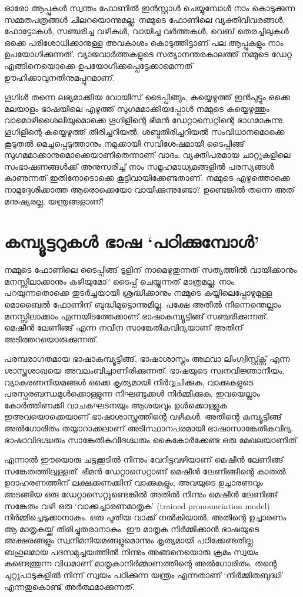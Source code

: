 \documentclass[12pt,twoside,a4paper]{article}
\begin{document}
ഓരോ ആപ്പുകൾ സ്വന്തം ഫോണിൽ ഇൻസ്റ്റാൾ ചെയ്യുമ്പോൾ നാം കൊടുക്കുന്ന സമ്മതപത്രങ്ങൾ ചിലറയൊന്നുമല്ല. നമ്മുടെ ഫോണിലെ വ്യക്തിവിവരങ്ങൾ, ഫോട്ടോകൾ, സഞ്ചരിച്ച വഴികൾ, വായിച്ച വർത്തകൾ, വെബ് തെരച്ചിലുകൾ ഒക്കെ പരിശോധിക്കാനുള്ള അവകാശം കൊടുത്തിട്ടാണ് പല ആപ്പുകളും നാം ഉപയോഗിക്കുന്നത്.  വ്യാജവാർത്തകളുടെ സത്യാനന്തരകാലത്ത്  നമ്മുടെ ഡേറ്റ എങ്ങിനെയൊക്കെ ഉപയോഗിക്കപ്പെട്ടേക്കാമെന്നത് ഊഹിക്കാവുനതിനുമപ്പുറമാണ്. 

ഗൂഗിൾ തന്നെ ലഭ്യമാക്കിയ വോയിസ് ടൈപ്പിങ്ങും, കയ്യെഴുത്ത് ഇൻപുട്ടും ഒക്കെ മലയാളം ഭാഷയിലെ എഴുത്ത് സുഗമമാക്കിയപ്പോൾ നമ്മുടെ കയ്യെഴുത്തും വാമൊഴിശൈലിയുമൊക്കെ ഗൂഗിളിന്റെ ഭീമൻ ഡേറ്റാസെറ്റിന്റെ ഭാഗമാകുന്നു. ഗൂഗിളിന്റെ കയ്യെഴുത്ത് തിരിച്ചറിയൽ, ശബ്ദതിരിച്ചറിയൽ സംവിധാനമൊക്കെ കൂടുതൽ മെച്ചപ്പെടുത്താനും നമുക്കായി സവിശേഷമായി ടൈപ്പിങ്ങ് സുഗമമാക്കാനുമൊക്കെയാണിതെന്നാണ് വാദം. വ്യക്തിപരമായ ചാറ്റുകളിലെ സംഭാഷണങ്ങൾക്ക് അനുസരിച്ച് നാം സമൂഹമാധ്യമങ്ങളിൽ പരസ്യങ്ങൾ  കാണുന്നത് ഇതിനോടൊക്കെ കൂട്ടിവായിക്കേണ്ടതാണ്. നമ്മുടെ എഴുത്തൊക്കെ നാമുദ്ദേശിക്കാത്ത ആരൊക്കെയോ വായിക്കുന്നുണ്ടോ? ഉണ്ടെങ്കിൽ തന്നെ അത് മനുഷ്യരല്ല, യന്ത്രങ്ങളാണ്!

\section{കമ്പ്യൂട്ടറുകൾ ഭാഷ `പഠിക്കുമ്പോൾ'}

നമ്മുടെ ഫോണിലെ ടൈപ്പിങ്ങ് ടൂളിന് നാമെഴുതുന്നത്  സത്യത്തിൽ വായിക്കാനും മനസ്സിലാക്കാനും കഴിയുമോ?  ടൈപ്പ് ചെയ്യുന്നത് മാത്രമല്ല, നാം പറയുന്നതൊക്കെ തുടർച്ചയായി ശ്രദ്ധിക്കാനും നമ്മുടെ കയ്യിലെപ്പോഴുമുള്ള മൊബൈൽ ഫോണിന് ബുദ്ധിമുട്ടൊന്നുമില്ല. പക്ഷേ അതിൽ നിന്നെന്തെല്ലാം മനസ്സിലാക്കാം എന്നയിടത്തേക്കാണ് ഭാഷാകമ്പ്യൂട്ടിങ്ങ് സഞ്ചരിക്കുന്നത്. മെഷീൻ ലേണിങ്ങ് എന്ന നവീന സാങ്കേതികവിദ്യയാണ് അതിന് അടിത്തറയൊരുക്കുന്നത്.

പരമ്പരാഗതമായ ഭാഷാകമ്പ്യൂട്ടിങ്ങ്, ഭാഷാശാസ്ത്രം അഥവാ ലിംഗ്വിസ്റ്റ്ക്സ് എന്ന ശാസ്ത്രശാഖയെ അവലംബിച്ചാണിരിക്കുന്നത്. ഭാഷയുടെ സ്വനവിജ്ഞാനീയം, വ്യാകരണനിയമങ്ങൾ ഒക്കെ കൃത്യമായി നിർവ്വചിക്കുക, വാക്കുകളുടെ പരസ്പരബന്ധമുൾക്കൊള്ളുന്ന നിഘണ്ടുക്കൾ നിർമ്മിക്കുക, ഇവയെല്ലാം കോർത്തിണക്കി വാചകഘടനയും ആശയവും ഉൾക്കൊള്ളുക ഇഅവയൊക്കെയാണ് ഭാഷാശാസ്ത്രത്തിന്റെ വഴികൾ. അതിന്റെ കമ്പ്യൂട്ടിങ്ങ് അൽഗോരിതം തയ്യാറാക്കലാണ് അടിസ്ഥാനപരമായി ഭാഷാസാങ്കേതികവിദ്യ. ഭാഷാവിദഗ്ദ്ധരും സാങ്കേതികവിദഗ്ദ്ധരും കൈകോർക്കേണ്ട ഒരു മേഖലയാണിത്.

എന്നാൽ ഈയൊരു ചട്ടക്കൂടിൽ നിന്നും വേറിട്ടവഴിയാണ് മെഷീൻ ലേണിങ്ങ് സങ്കേതത്തിലുള്ളത്. ഭീമൻ ഡേറ്റാസെറ്റാണ് മെഷീൻ ലേണിങ്ങിന്റെ കാതൽ. ഉദാഹരണത്തിന് ലക്ഷക്കണക്കിന് വാക്കുകളും, അവയുടെ ഉച്ചാരണവും അടങ്ങിയ ഒരു ഡേറ്റാസെറ്റുണ്ടെങ്കിൽ അതിൽ നിന്നും മെഷീൻ ലേണിങ്ങ് സങ്കേതം വഴി ഒരു `വാക്കുച്ചാരണമാതൃക' (trained pronounciation model) നിർമ്മിച്ചെടുക്കാനാകും. ഒരു പുതിയ വാക്ക് നൽകിയാൽ, അതിന്റെ ഉച്ചാരണം ആ മാതൃകയ്ക്ക് തിരിച്ചുതരാനാകും. ഈ മാതൃക നിർമ്മിക്കാൻ ഭാഷയുടെ അക്ഷരങ്ങളും സ്വനിമനിയമങ്ങളുമൊന്നും കൃത്യമായി പഠിക്കേണ്ടതില്ല. ബഹുലമായ പദസമുച്ചയത്തിൽ നിന്നും അങ്ങനെയൊരു ക്രമം സ്വയം കണ്ടെത്തുന്ന വിധമാണ് മാതൃകാനിർമ്മാണത്തിന്റെ അൽഗോരിതം. തന്റെ ചുറ്റുപാടുകളിൽ നിന്ന് സ്വയം പഠിക്കുന്ന യന്ത്രം എന്നതാണ് `നിർമ്മിതബുദ്ധി' എന്നതുകൊണ്ട് അർത്ഥമാക്കുന്നത്.
\end{document}
